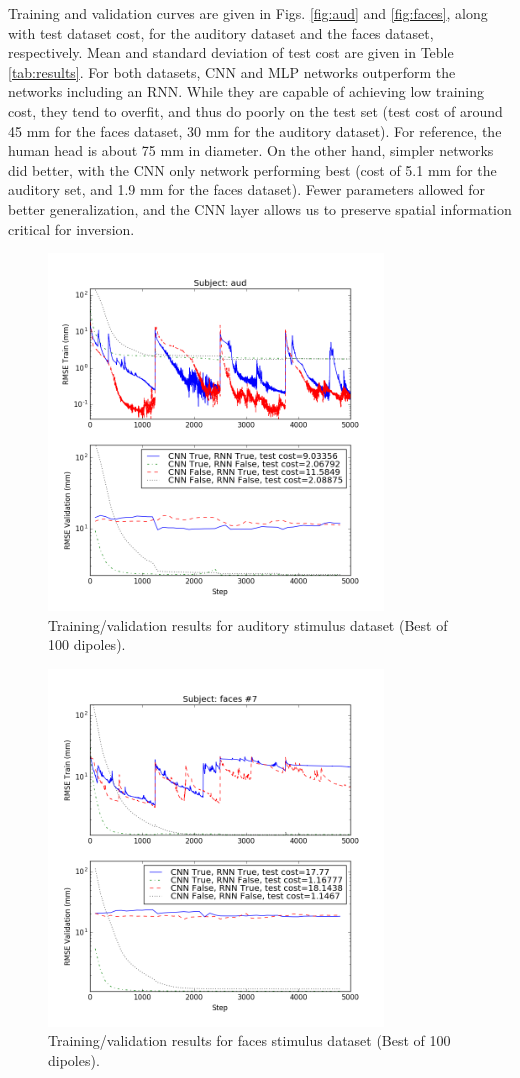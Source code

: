 \documentclass[journal]{IEEEtran}
\begin{document}
Training and validation curves are given in Figs. \ref{fig:aud} and \ref{fig:faces}, along with test dataset cost, for the auditory dataset and the faces dataset, respectively. Mean and standard deviation of test cost are given in Teble \ref{tab:results}. For both datasets, CNN and MLP networks outperform the networks including an RNN. While they are capable of achieving low training cost, they tend to overfit, and thus do poorly on the test set (test cost of around 45 mm for the faces dataset, 30 mm for the auditory dataset). For reference, the human head is about 75 mm in diameter. On the other hand, simpler networks did better, with the CNN only network performing best (cost of 5.1 mm for the auditory set, and 1.9 mm for the faces dataset). Fewer parameters allowed for better generalization, and the CNN layer allows us to preserve spatial information critical for inversion.
\begin{figure}[h!]
\centering
\includegraphics[width=3.5in]{aud100}
\caption{Training/validation results for auditory stimulus dataset (Best of 100 dipoles).}
\label{fig:aud100}
\end{figure}

\begin{figure}[h!]
\centering
\includegraphics[width=3.5in]{faces100}
\caption{Training/validation results for faces stimulus dataset (Best of 100 dipoles).}
\label{fig:faces100}
\end{figure}
\end{document}
